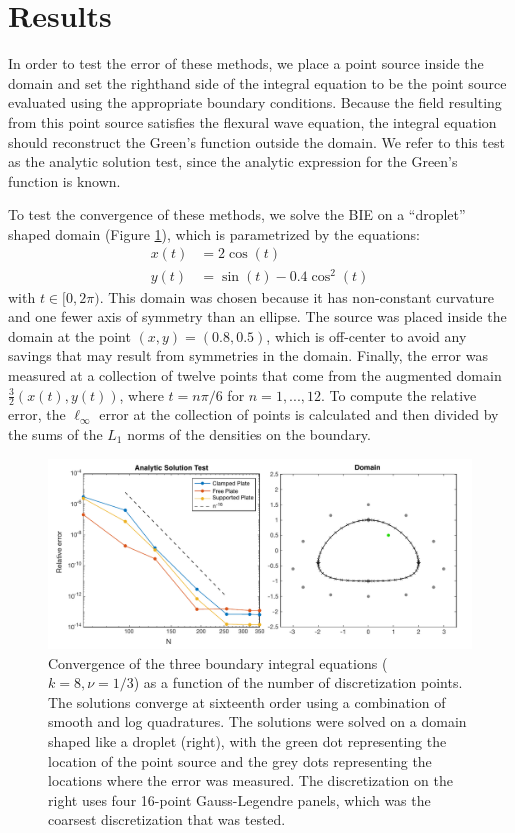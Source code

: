 \documentclass[preprint,12pt,3p]{elsarticle}
\begin{document}
\section{Results} \label{results}


In order to test the error of these methods, we place a point source inside the domain and set the righthand side of the integral equation to be the point source evaluated using the appropriate boundary conditions. Because the field resulting from this point source satisfies the flexural wave equation, the integral equation should reconstruct the Green's function outside the domain. We refer to this test as the analytic solution test, since the analytic expression for the Green's function is known. 



To test the convergence of these methods, we solve the BIE on a ``droplet'' shaped domain (Figure \ref{convergence_figure}), which is parametrized by the equations:
\begin{align}
x(t) &= 2 \cos(t) \\
y(t) &= \sin(t) - 0.4 \cos^2(t)
\end{align}
with $t \in [0, 2\pi)$. This domain was chosen because it has non-constant curvature and one fewer axis of symmetry than an ellipse. The source was placed inside the domain at the point $(x,y) = (0.8, 0.5)$, which is off-center to avoid any savings that may result from symmetries in the domain. Finally, the error was measured at a collection of twelve points that come from the augmented domain $\frac{3}{2} ( x(t), y(t) )$, where $t = n \pi / 6$ for $n = 1, ..., 12$. To compute the relative error, the $\ell_\infty$ error at the collection of points is calculated and then divided by the sums of the $L_1$ norms of the densities on the boundary. 


\begin{figure}[ht]
\hspace{-0.75cm}\includegraphics[scale=0.83]{convergence_figure.pdf}
\caption{Convergence of the three boundary integral equations ($k = 8, \nu = 1/3$) as a function of the number of discretization points. The solutions converge at sixteenth order using a combination of smooth and log quadratures. The solutions were solved on a domain shaped like a droplet (right), with the green dot representing the location of the point source and the grey dots representing the locations where the error was measured. The discretization on the right uses four 16-point Gauss-Legendre panels, which was the coarsest discretization that was tested. }\label{convergence_figure}
\end{figure}
\end{document}
